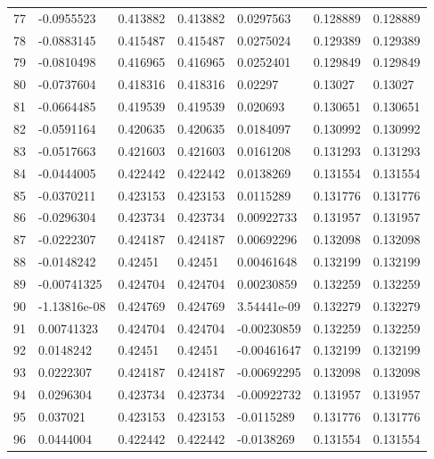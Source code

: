 \begin{longtable}{l|lll|lll}
  77 & -0.0955523   & 0.413882    & 0.413882    &  0.0297563   & 0.128889    & 0.128889    \\
  78 & -0.0883145   & 0.415487    & 0.415487    &  0.0275024   & 0.129389    & 0.129389    \\
  79 & -0.0810498   & 0.416965    & 0.416965    &  0.0252401   & 0.129849    & 0.129849    \\
  80 & -0.0737604   & 0.418316    & 0.418316    &  0.02297     & 0.13027     & 0.13027     \\
  81 & -0.0664485   & 0.419539    & 0.419539    &  0.020693    & 0.130651    & 0.130651    \\
  82 & -0.0591164   & 0.420635    & 0.420635    &  0.0184097   & 0.130992    & 0.130992    \\
  83 & -0.0517663   & 0.421603    & 0.421603    &  0.0161208   & 0.131293    & 0.131293    \\
  84 & -0.0444005   & 0.422442    & 0.422442    &  0.0138269   & 0.131554    & 0.131554    \\
  85 & -0.0370211   & 0.423153    & 0.423153    &  0.0115289   & 0.131776    & 0.131776    \\
  86 & -0.0296304   & 0.423734    & 0.423734    &  0.00922733  & 0.131957    & 0.131957    \\
  87 & -0.0222307   & 0.424187    & 0.424187    &  0.00692296  & 0.132098    & 0.132098    \\
  88 & -0.0148242   & 0.42451     & 0.42451     &  0.00461648  & 0.132199    & 0.132199    \\
  89 & -0.00741325  & 0.424704    & 0.424704    &  0.00230859  & 0.132259    & 0.132259    \\
  90 & -1.13816e-08 & 0.424769    & 0.424769    &  3.54441e-09 & 0.132279    & 0.132279    \\
  91 &  0.00741323  & 0.424704    & 0.424704    & -0.00230859  & 0.132259    & 0.132259    \\
  92 &  0.0148242   & 0.42451     & 0.42451     & -0.00461647  & 0.132199    & 0.132199    \\
  93 &  0.0222307   & 0.424187    & 0.424187    & -0.00692295  & 0.132098    & 0.132098    \\
  94 &  0.0296304   & 0.423734    & 0.423734    & -0.00922732  & 0.131957    & 0.131957    \\
  95 &  0.037021    & 0.423153    & 0.423153    & -0.0115289   & 0.131776    & 0.131776    \\
  96 &  0.0444004   & 0.422442    & 0.422442    & -0.0138269   & 0.131554    & 0.131554    \\

\end{longtable}

